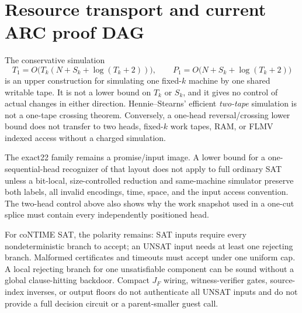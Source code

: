 \documentclass[11pt]{article}
\begin{document}
\section{Resource transport and current ARC proof DAG}
The conservative simulation
\[
T_1=O\bigl(T_k(N+S_k+\log(T_k+2))\bigr),\qquad
P_1=O\bigl(N+S_k+\log(T_k+2)\bigr)
\]
is an upper construction for simulating one fixed-$k$ machine by one shared writable tape.  It is not a lower bound on $T_k$ or $S_k$, and it gives no control of actual changes in either direction.  Hennie--Stearns' efficient \emph{two-tape} simulation is not a one-tape crossing theorem.  Conversely, a one-head reversal/crossing lower bound does not transfer to two heads, fixed-$k$ work tapes, RAM, or FLMV indexed access without a charged simulation.

The exact22 family remains a promise/input image.  A lower bound for a one-sequential-head recognizer of that layout does not apply to full ordinary SAT unless a bit-local, size-controlled reduction and same-machine simulator preserve both labels, all invalid encodings, time, space, and the input access convention.  The two-head control above also shows why the work snapshot used in a one-cut splice must contain every independently positioned head.

For coNTIME SAT, the polarity remains: SAT inputs require every nondeterministic branch to accept; an UNSAT input needs at least one rejecting branch.  Malformed certificates and timeouts must accept under one uniform cap.  A local rejecting branch for one unsatisfiable component can be sound without a global clause-hitting backdoor.  Compact $J_F$ wiring, witness-verifier gates, source-index inverses, or output floors do not authenticate all UNSAT inputs and do not provide a full decision circuit or a parent-smaller guest call.
\end{document}
